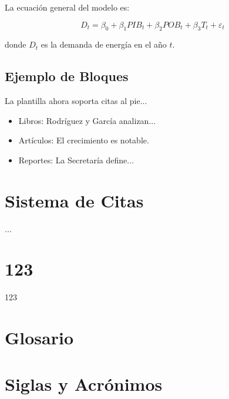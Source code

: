 \documentclass{sener2025}
\begin{document}
La ecuación general del modelo es:

 \begin{equation}
 D_t = \beta_0 + \beta_1 PIB_t + \beta_2 POB_t + \beta_3 T_t + \varepsilon_t
\end{equation}

 donde $ D_t$ es la demanda de energía en el año $ t$.


\subsection{Ejemplo de Bloques}

La plantilla ahora soporta citas al pie...

\begin{ejemplo}[title={Ejemplo}]
\begin{itemize}
  \item Libros: Rodríguez y García analizan...
  \item Artículos: El crecimiento es notable.
  \item Reportes: La Secretaría define...
\end{itemize}

\end{ejemplo}



\section{Sistema de Citas}

...


\section{123}

123


\section*{Glosario}
{}


\printbibliography

\section*{Siglas y Acrónimos}
{}
\end{document}
